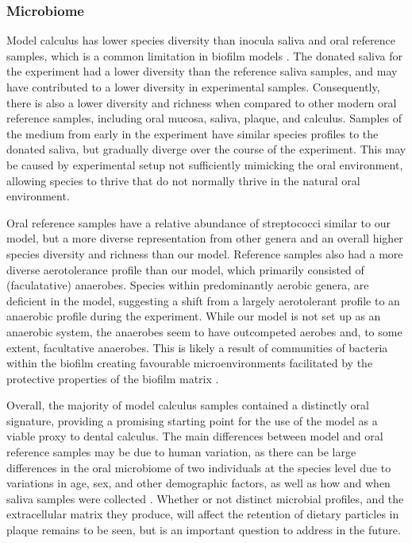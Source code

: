 \documentclass[10pt,a4paper]{article}
\begin{document}
\subsubsection*{Microbiome}\label{microbiome}

Model calculus has lower species diversity than inocula saliva and oral
reference samples, which is a common limitation in biofilm models
\citep{edlundBiofilmModel2013, bjarnsholtVivoBiofilm2013}. The donated
saliva for the experiment had a lower diversity than the reference
saliva samples, and may have contributed to a lower diversity in
experimental samples. Consequently, there is also a lower diversity and
richness when compared to other modern oral reference samples, including
oral mucosa, saliva, plaque, and calculus. Samples of the medium from
early in the experiment have similar species profiles to the donated
saliva, but gradually diverge over the course of the experiment. This
may be caused by experimental setup not sufficiently mimicking the oral
environment, allowing species to thrive that do not normally thrive in
the natural oral environment.

Oral reference samples have a relative abundance of streptococci similar
to our model, but a more diverse representation from other genera and an
overall higher species diversity and richness than our model. Reference
samples also had a more diverse aerotolerance profile than our model,
which primarily consisted of (faculatative) anaerobes. Species within
predominantly aerobic genera, are deficient in the model, suggesting a
shift from a largely aerotolerant profile to an anaerobic profile during
the experiment. While our model is not set up as an anaerobic system,
the anaerobes seem to have outcompeted aerobes and, to some extent,
facultative anaerobes. This is likely a result of communities of
bacteria within the biofilm creating favourable microenvironments
facilitated by the protective properties of the biofilm matrix
\citep{flemmingBiofilmsEmergent2016, edlundUncoveringComplex2018}.

Overall, the majority of model calculus samples contained a distinctly
oral signature, providing a promising starting point for the use of the
model as a viable proxy to dental calculus. The main differences between
model and oral reference samples may be due to human variation, as there
can be large differences in the oral microbiome of two individuals at
the species level due to variations in age, sex, and other demographic
factors, as well as how and when saliva samples were collected
\citep{burchamPatternsOral2020, nearingAssessingVariation2020}. Whether
or not distinct microbial profiles, and the extracellular matrix they
produce, will affect the retention of dietary particles in plaque
remains to be seen, but is an important question to address in the
future.
\end{document}
